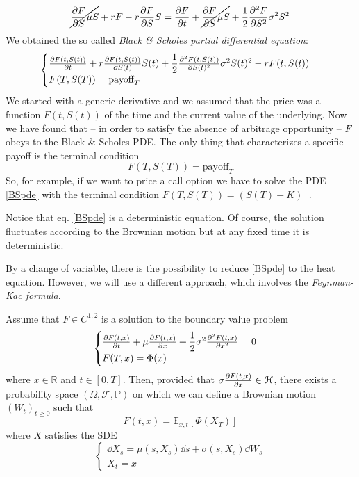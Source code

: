 \begin{equation*}
    \cancel{\pdv{F}{S}\mu S} + rF - r\pdv{F}{S} S = \pdv{F}{t} + \cancel{\pdv{F}{S}\mu S} + \dfrac{1}{2}\pdv[2]{F}{S}\sigma^2S^2
\end{equation*}
We obtained the so called \emph{Black \& Scholes partial differential equation}:
\begin{equation}\label{BSpde}
    \begin{cases}
    \pdv{F(t,S(t))}{t} + r\pdv{F(t,S(t))}{S(t)} S(t) + \dfrac{1}{2}\pdv[2]{F(t,S(t))}{S(t)}\sigma^2S(t)^2 - rF(t,S(t))\\
    F(T,S(T)) = \mbox{payoff}_T
    \end{cases}
\end{equation}
We started with a generic derivative and we assumed that the price was a function $F(t,S(t))$ of the time and the current value of the underlying. Now we have found that -- in order to satisfy the absence of arbitrage opportunity -- $F$ obeys to the Black \& Scholes PDE. The only thing that characterizes a specific payoff is the terminal condition
\begin{equation}
    F(T,S(T)) = \mbox{payoff}_T
\end{equation}
So, for example, if we want to price a call option we have to solve the PDE \eqref{BSpde} with the terminal condition $F(T,S(T))=(S(T)-K)^+$.
\begin{remark}
    Notice that eq. \eqref{BSpde} is a deterministic equation. Of course, the solution fluctuates according to the Brownian motion but at any fixed time it is deterministic.
\end{remark}
By a change of variable, there is the possibility to reduce \eqref{BSpde} to the heat equation. However, we will use a different approach, which involves the \emph{Feynman-Kac formula}.
\begin{theorem}
    Assume that $F\in C^{1,2}$ is a solution to the boundary value problem
    \begin{equation}\label{bvp}
        \begin{cases}
        \pdv{F(t,x)}{t} + \mu\pdv{F(t,x)}{x} + \dfrac{1}{2}\sigma^2\pdv[2]{F(t,x)}{x}=0\\
        F(T,x) = \Phi(x)
        \end{cases}
    \end{equation}
    where $x\in\mathbb{R}$ and $t\in[0,T]$. Then, provided that $\sigma\pdv{F(t,x)}{x}\in\mathcal{H}$, there exists a probability space $(\Omega,\mathcal{F},\mathbb{P})$ on which we can define a Brownian motion $(W_t)_{t\ge0}$ such that
    \begin{equation}
        F(t,x) = \mathbb{E}_{x,t}[\Phi(X_T)]
    \end{equation}
    where $X$ satisfies the SDE
    \begin{equation}\label{fk}
        \begin{cases}
        \dd X_s = \mu(s, X_s)\dd s + \sigma(s, X_s)\dd W_s\\
        X_t = x
        \end{cases}
    \end{equation}
\end{theorem}  
